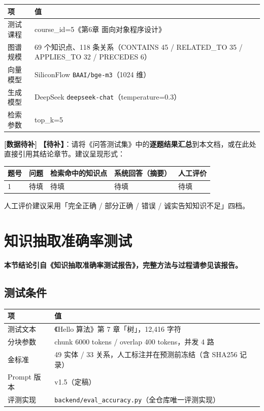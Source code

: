 \documentclass[UTF8,a4paper,11pt]{ctexrep}
\newcommand{\todomark}{\textcolor{todobar}{\textbf{[数据待补]}}}
\begin{document}
\begin{center}
\small
\begin{tabularx}{\linewidth}{@{}XX@{}}
\toprule
项 & 值 \\
\midrule
测试课程 & course\_id=5《第6章 面向对象程序设计》 \\
图谱规模 & 69 个知识点、118 条关系（CONTAINS 45 / RELATED\_TO 35 / APPLIES\_TO 32 / PRECEDES 6） \\
向量模型 & SiliconFlow \texttt{BAAI/bge-m3}（1024 维） \\
生成模型 & DeepSeek \texttt{deepseek-chat}（temperature=0.3） \\
检索参数 & top\_k=5 \\
\bottomrule
\end{tabularx}
\end{center}
\begin{todobox}
\todomark{} \textbf{【待补】}：请将《问答测试集》中的\textbf{逐题结果汇总}到本文档，或在此处直接引用其结论章节。建议呈现形式：

\begin{center}
\footnotesize
\begin{tabularx}{\linewidth}{@{}XXXXX@{}}
\toprule
题号 & 问题 & 检索命中的知识点 & 系统回答（摘要） & 人工评价 \\
\midrule
1 & 待填 & 待填 & 待填 & 待填 \\
\bottomrule
\end{tabularx}
\end{center}
人工评价建议采用「完全正确 / 部分正确 / 错误 / 诚实告知知识不足」四档。

\end{todobox}


\section{知识抽取准确率测试}

\textbf{本节结论引自《知识抽取准确率测试报告》，完整方法与过程请参见该报告。}


\subsection{测试条件}

\begin{center}
\small
\begin{tabularx}{\linewidth}{@{}XX@{}}
\toprule
项 & 值 \\
\midrule
测试文本 & 《Hello 算法》第 7 章「树」，12,416 字符 \\
分块参数 & chunk 6000 tokens / overlap 400 tokens，并发 4 路 \\
金标准 & 49 实体 / 33 关系，人工标注并在预测前冻结（含 SHA256 记录） \\
Prompt 版本 & v1.5（定稿） \\
评测实现 & \texttt{backend/eval\_accuracy.py}（全仓库唯一评测实现） \\
\bottomrule
\end{tabularx}
\end{center}
\end{document}
